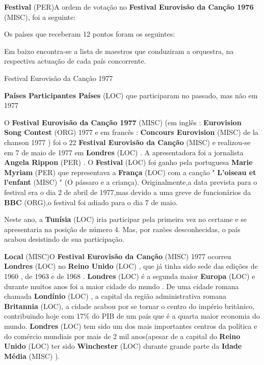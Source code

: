 \documentclass[12pt,a4paper]{article}
\begin{document}
\textbf{Festival} (PER)A ordem de votação no \textbf{Festival Eurovisão da Canção 1976} (MISC), foi a seguinte:

Os países que receberam 12 pontos foram os seguintes:

Em baixo encontra-se a lista de maestros que conduziram a orquestra, na respectiva actuação de cada país concorrente.



Festival Eurovisão da Canção 1977



\textbf{Países Participantes Países} (LOC) que participaram no passado, mas não em 1977

O \textbf{Festival Eurovisão da Canção 1977} (MISC) (em inglês : \textbf{Eurovision Song Contest} (ORG) 1977 e em francês : \textbf{Concours Eurovision} (MISC) de la chanson 1977 ) foi o 22 \textbf{Festival Eurovisão da Canção} (MISC) e realizou-se em 7 de maio de 1977 em \textbf{Londres} (LOC) . A apresentadora foi a jornalista \textbf{Angela Rippon} (PER) . O \textbf{Festival} (LOC) foi ganho pela portuguesa \textbf{Marie Myriam} (PER) que representava a \textbf{França} (LOC) com a canção " \textbf{L'oiseau et l'enfant} (MISC) " (O pássaro e a criança). Originalmente,a data prevista para o festival era o dia 2 de abril de 1977,mas devido a uma greve de funcionários da \textbf{BBC} (ORG),o festival foi adiado para o dia 7 de maio.

Neste ano, a \textbf{Tunísia} (LOC) iria participar pela primeira vez no certame e se apresentaria na posição de número 4. Mas, por razões desconhecidas, o país acabou desistindo de sua participação.



\textbf{Local} (MISC)O \textbf{Festival Eurovisão da Canção} (MISC) 1977 ocorreu \textbf{Londres} (LOC) no \textbf{Reino Unido} (LOC) , que já tinha sido sede das edições de 1960 , de 1963 e de 1968 . \textbf{Londres} (LOC) é a segunda maior \textbf{Europa} (LOC) e durante muitos anos foi a maior cidade do mundo . De uma cidade romana chamada \textbf{Londínio} (LOC) , a capital da região administrativa romana \textbf{Britannia} (LOC), a cidade acabou por se tornar o centro do império britânico, contribuindo hoje com 17\% do PIB de um país que é a quarta maior economia do mundo. \textbf{Londres} (LOC) tem sido um dos mais importantes centros da política e do comércio mundiais por mais de 2 mil anos(apesar de a capital do \textbf{Reino Unido} (LOC) ter sido \textbf{Winchester} (LOC) durante grande parte da \textbf{Idade Média} (MISC) ).
\end{document}
